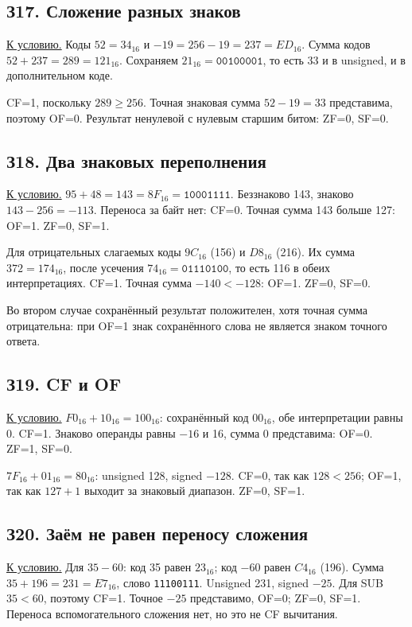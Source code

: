 \subsection*{З17. Сложение разных знаков}\label{sol:z17}
\hyperref[task:z17]{К условию.}
Коды $52=34_{16}$ и $-19=256-19=237=ED_{16}$.
Сумма кодов $52+237=289=121_{16}$. Сохраняем $21_{16}=\texttt{00100001}$, то есть 33 и в unsigned, и в дополнительном коде.

CF=1, поскольку $289\ge256$. Точная знаковая сумма $52-19=33$ представима, поэтому OF=0. Результат ненулевой с нулевым старшим битом: ZF=0, SF=0.

\subsection*{З18. Два знаковых переполнения}\label{sol:z18}
\hyperref[task:z18]{К условию.}
$95+48=143=8F_{16}=\texttt{10001111}$. Беззнаково 143, знаково $143-256=-113$. Переноса за байт нет: CF=0. Точная сумма 143 больше 127: OF=1. ZF=0, SF=1.

Для отрицательных слагаемых коды $9C_{16}$ (156) и $D8_{16}$ (216). Их сумма $372=174_{16}$, после усечения $74_{16}=\texttt{01110100}$, то есть 116 в обеих интерпретациях. CF=1. Точная сумма $-140<-128$: OF=1. ZF=0, SF=0.

Во втором случае сохранённый результат положителен, хотя точная сумма отрицательна: при OF=1 знак сохранённого слова не является знаком точного ответа.

\subsection*{З19. CF и OF}\label{sol:z19}
\hyperref[task:z19]{К условию.}
$F0_{16}+10_{16}=100_{16}$: сохранённый код $00_{16}$, обе интерпретации равны 0. CF=1. Знаково операнды равны $-16$ и 16, сумма 0 представима: OF=0. ZF=1, SF=0.

$7F_{16}+01_{16}=80_{16}$: unsigned 128, signed $-128$. CF=0, так как $128<256$; OF=1, так как $127+1$ выходит за знаковый диапазон. ZF=0, SF=1.

\subsection*{З20. Заём не равен переносу сложения}\label{sol:z20}
\hyperref[task:z20]{К условию.}
Для $35-60$: код 35 равен $23_{16}$; код $-60$ равен $C4_{16}$ (196). Сумма $35+196=231=E7_{16}$, слово \texttt{11100111}. Unsigned 231, signed $-25$.
Для SUB $35<60$, поэтому CF=1. Точное $-25$ представимо, OF=0; ZF=0, SF=1. Переноса вспомогательного сложения нет, но это не CF вычитания.


